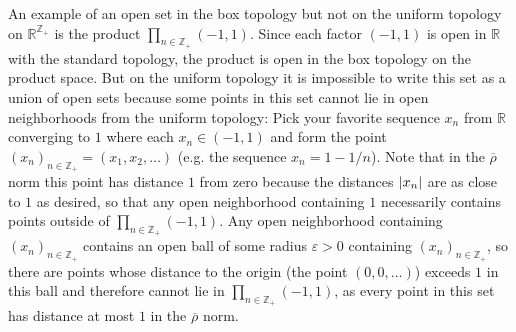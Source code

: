 \documentclass[11pt]{article}
\begin{document}
\begin{enumerate}
    An example of an open set in the box topology but not on the uniform topology on $\mathbb{R}^{\mathbb{Z}_+}$ is the product $\prod_{n\in\mathbb{Z}_+}(-1,1)$. Since each factor $(-1,1)$ is open in $\mathbb{R}$ with the standard topology, the product is open in the box topology on the product space. But on the uniform topology it is impossible to write this set as a union of open sets because some points in this set cannot lie in open neighborhoods from the uniform topology: Pick your favorite sequence $x_n$ from $\mathbb{R}$ converging to $1$ where each $x_n\in (-1,1)$ and form the point $(x_n)_{n\in\mathbb{Z}_+} = (x_1, x_2, \dots)$ (e.g. the sequence $x_n = 1-1/n$). Note that in the $\overline{\rho}$ norm this point has distance $1$ from zero because the distances $\abs{x_n}$ are as close to $1$ as desired, so that any open neighborhood containing $1$ necessarily contains points outside of $\prod_{n\in\mathbb{Z}_+}(-1,1)$. Any open neighborhood containing $(x_n)_{n\in\mathbb{Z}_+}$ contains an open ball of some radius $\varepsilon>0$ containing $(x_n)_{n\in\mathbb{Z}_+}$, so there are points whose distance to the origin (the point $(0,0,\dots)$) exceeds $1$ in this ball and therefore cannot lie in $\prod_{n\in\mathbb{Z}_+}(-1,1)$, as every point in this set has distance at most $1$ in the $\overline{\rho}$ norm.


\end{enumerate}
\end{document}
